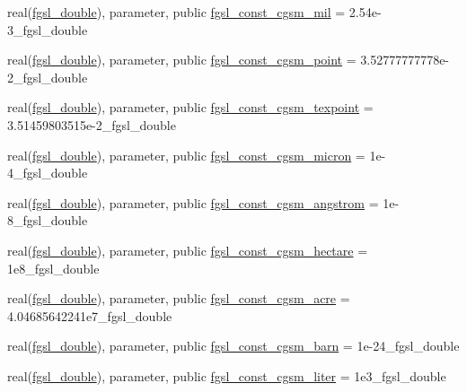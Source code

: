 \begin{DoxyCompactItemize}
\item 
real(\hyperlink{namespacefgsl_a9af5113378e0f000eb479d3f90196ddf}{fgsl\+\_\+double}), parameter, public \hyperlink{namespacefgsl_afa02507efeb6d20012bb31b69efa6291}{fgsl\+\_\+const\+\_\+cgsm\+\_\+mil} = 2.\+54e-\/3\+\_\+fgsl\+\_\+double
\item 
real(\hyperlink{namespacefgsl_a9af5113378e0f000eb479d3f90196ddf}{fgsl\+\_\+double}), parameter, public \hyperlink{namespacefgsl_a924bd137c2b9e9abffbc4edb9826b398}{fgsl\+\_\+const\+\_\+cgsm\+\_\+point} = 3.\+52777777778e-\/2\+\_\+fgsl\+\_\+double
\item 
real(\hyperlink{namespacefgsl_a9af5113378e0f000eb479d3f90196ddf}{fgsl\+\_\+double}), parameter, public \hyperlink{namespacefgsl_af0bb6a664a268b6db97ed93021e98828}{fgsl\+\_\+const\+\_\+cgsm\+\_\+texpoint} = 3.\+51459803515e-\/2\+\_\+fgsl\+\_\+double
\item 
real(\hyperlink{namespacefgsl_a9af5113378e0f000eb479d3f90196ddf}{fgsl\+\_\+double}), parameter, public \hyperlink{namespacefgsl_afa1f606b298574904dc1963ed870db4b}{fgsl\+\_\+const\+\_\+cgsm\+\_\+micron} = 1e-\/4\+\_\+fgsl\+\_\+double
\item 
real(\hyperlink{namespacefgsl_a9af5113378e0f000eb479d3f90196ddf}{fgsl\+\_\+double}), parameter, public \hyperlink{namespacefgsl_aedfe01763a71e3f82c2dee8a2586b442}{fgsl\+\_\+const\+\_\+cgsm\+\_\+angstrom} = 1e-\/8\+\_\+fgsl\+\_\+double
\item 
real(\hyperlink{namespacefgsl_a9af5113378e0f000eb479d3f90196ddf}{fgsl\+\_\+double}), parameter, public \hyperlink{namespacefgsl_a4d19d597ffc77fc0c1aa577276cab117}{fgsl\+\_\+const\+\_\+cgsm\+\_\+hectare} = 1e8\+\_\+fgsl\+\_\+double
\item 
real(\hyperlink{namespacefgsl_a9af5113378e0f000eb479d3f90196ddf}{fgsl\+\_\+double}), parameter, public \hyperlink{namespacefgsl_a6417ace541dc0310036197a333495c36}{fgsl\+\_\+const\+\_\+cgsm\+\_\+acre} = 4.\+04685642241e7\+\_\+fgsl\+\_\+double
\item 
real(\hyperlink{namespacefgsl_a9af5113378e0f000eb479d3f90196ddf}{fgsl\+\_\+double}), parameter, public \hyperlink{namespacefgsl_a96f3fd765f8469355c932e287e34f25a}{fgsl\+\_\+const\+\_\+cgsm\+\_\+barn} = 1e-\/24\+\_\+fgsl\+\_\+double
\item 
real(\hyperlink{namespacefgsl_a9af5113378e0f000eb479d3f90196ddf}{fgsl\+\_\+double}), parameter, public \hyperlink{namespacefgsl_aa765c28c4966a92d631fc0d4721e7160}{fgsl\+\_\+const\+\_\+cgsm\+\_\+liter} = 1e3\+\_\+fgsl\+\_\+double
\item 

\end{DoxyCompactItemize}
